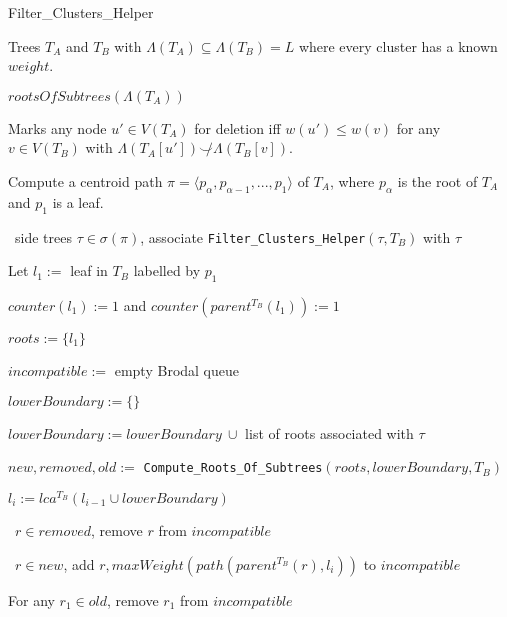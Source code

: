\documentclass{article}
\newcommand{\compatible}{\smile}
\newcommand{\leafset}{\Lambda}
\begin{document}
    \begin{algorithm}
        \caption{Filter\_Clusters\_Helper}
        \label{alg:filterclustershelper}

        \begin{algorithmic}[1]
            \Input Trees $T_A$ and $T_B$ with $\leafset(T_A) \subseteq \leafset(T_B) = L$ where every cluster has a known $weight$.

            \Output $rootsOfSubtrees(\leafset(T_A))$

            \SideEffect Marks any node $u' \in V(T_A)$ for deletion iff $w(u') \leq w(v)$ for any $v \in V(T_B)$ with $\leafset(T_A[u']) \not\compatible \leafset(T_B[v])$.

            \State Compute a centroid path $\pi = \langle p_{\alpha}, p_{\alpha - 1}, ..., p_1 \rangle$ of $T_A$, where $p_{\alpha}$ is the root of $T_A$ and $p_1$ is a leaf.

            \State \algorithmicforall\ side trees $\tau \in \sigma(\pi)$,
                associate \texttt{Filter\_Clusters\_Helper}$(\tau, T_B)$ with $\tau$

            \State Let $l_1 :=$ leaf in $T_B$ labelled by $p_1$

            \State $counter(l_1) := 1$ and $counter(parent^{T_B}(l_1)) := 1$

            \State $roots := \{l_1\}$

            \State $incompatible :=$ empty Brodal queue

                \State $lowerBoundary := \{\}$

                    \State $lowerBoundary := lowerBoundary\ \cup$ list of roots associated with $\tau$
                \EndFor

                \State $new, removed, old :=$ \texttt{Compute\_Roots\_Of\_Subtrees}$(roots, lowerBoundary, T_B)$

                \State $l_i := lca^{T_B}(l_{i-1} \cup lowerBoundary)$

                \State \algorithmicforall\ $r \in removed$, remove $r$ from $incompatible$

                \State \algorithmicforall\ $r \in new$, add $r, maxWeight(path(parent^{T_B}(r), l_i))$ to $incompatible$

                    \State For any $r_1 \in old$, remove $r_1$ from $incompatible$


\end{algorithmic}
\end{algorithm}
\end{document}
